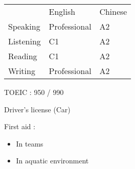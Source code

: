 \documentclass[11pt]{spidercv}
\begin{document}
\begin{SideBar}{\ColorBackground}{\ColorTextSide}
  \vspace{0.5cm}


  \begin{tabular}{lll}
              & English      & Chinese \\
    \cmidrule{2-3}
    Speaking  & Professional & A2      \\
    \cmidrule{2-3}
    Listening & C1           & A2      \\
    \cmidrule{2-3}
    Reading   & C1           & A2      \\
    \cmidrule{2-3}
    Writing   & Professional & A2
  \end{tabular}

  \vspace{0.5cm}
  \begin{ItemList}{\ColorHighlight}
    \item [\ding{226}] TOEIC : 950 / 990
    \item [\ding{226}] Driver's license (Car)
    \item [\ding{226}] First aid :
    \begin{itemize}
      \item In teams
      \item In aquatic environment
    \end{itemize}
  \end{ItemList}

  \vspace{0.75cm}
\end{SideBar}



\end{document}
